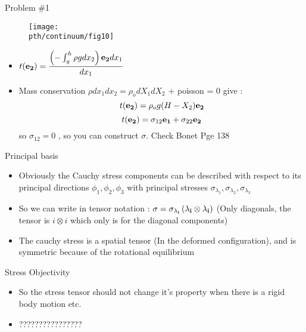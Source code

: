 	\begin{frame}{Problem \#1}
		\begin{figure}
			\centering
			\texttt{[image: \\pth/continuum/fig10]}
		\end{figure}
	\begin{itemize}
		\item $t(\mathbf{e_2}) = \dfrac{\left(-\int_{y}^{h} \rho g dx_2 \right)\mathbf{e_2}dx_1}{dx_1}$
		\item Mass conservation $\rho dx_1dx_2 = \rho_o dX_1dX_2$ + poisson = 0 give :
		\begin{equation}
		t(\mathbf{e_2}) = \rho_o g (H- X_2) \mathbf{e_2}
		\end{equation}
		\begin{equation}
		t(\mathbf{e_2}) = \sigma_{12}\mathbf{e_1} + \sigma_{22}\mathbf{e_2}
		\end{equation}
		so $\sigma_{12} = 0$ , so you can construct $\sigma$. Check Bonet Pge 138
	\end{itemize}
	\end{frame}

	\begin{frame}{Principal basis}
		\begin{itemize}
			\item Obviously the Cauchy stress components can be described with respect to its principal directions $\phi_1,\phi_2,\phi_3$ with principal stresses $\sigma_{\lambda_1},\sigma_{\lambda_2},\sigma_{\lambda_3}$
			\item So we can write in tensor notation :
			$\mathbf{\sigma = \sigma_{\lambda_i} \left(\lambda_i \otimes \lambda_i \right)}$
			(Only diagonals, the tensor is $i \otimes i$ which only is for the diagonal components)
			\item The cauchy stress is a spatial tensor (In the deformed configuration), and is symmetric because of the rotational equilibrium
		\end{itemize}
	\end{frame}

	\begin{frame}{Stress Objectivity}
		\begin{itemize}
			\item So the stress tensor should not change it's property when there is a rigid body motion etc.
			\item ???????????????? 
			
		\end{itemize}
	\end{frame}


